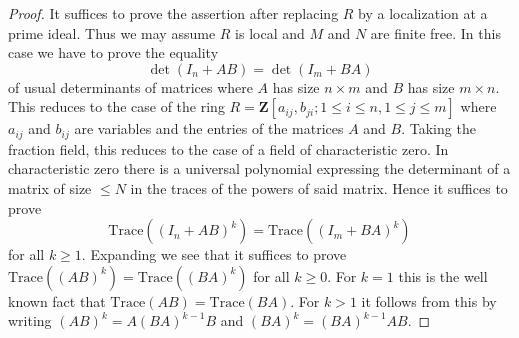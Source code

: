 \documentclass[10pt,a4paper]{amsart}
\theoremstyle{plain}
\theoremstyle{definition}
\theoremstyle{remark}
\numberwithin{equation}{subsection}
\begin{document}
\begin{proof}
It suffices to prove the assertion after replacing $R$ by a localization
at a prime ideal. Thus we may assume $R$ is local and $M$ and $N$ are
finite free. In this case we have to prove the equality
$$
\det(I_n + AB) = \det(I_m + BA)
$$
of usual determinants of matrices where $A$ has size $n \times m$
and $B$ has size $m \times n$. This reduces to the case
of the ring $R = \mathbf{Z}[a_{ij}, b_{ji}; 1 \leq i \leq n, 1 \leq j \leq m]$
where $a_{ij}$ and $b_{ij}$ are variables and the entries of the
matrices $A$ and $B$. Taking the fraction field, this reduces to the
case of a field of characteristic zero. In characteristic zero there
is a universal polynomial expressing the determinant of a matrix
of size $\leq N$ in the traces of the powers of said matrix.
Hence it suffices to prove
$$
\text{Trace}((I_n + AB)^k) = \text{Trace}((I_m + BA)^k)
$$
for all $k \geq 1$. Expanding we see that it suffices to prove
$\text{Trace}((AB)^k) = \text{Trace}((BA)^k)$ for all $k \geq 0$.
For $k = 1$ this is the well known fact that
$\text{Trace}(AB) = \text{Trace}(BA)$. For $k > 1$
it follows from this by writing $(AB)^k = A(BA)^{k - 1}B$
and $(BA)^k = (BA)^{k - 1} A B$.
\end{proof}
\end{document}

